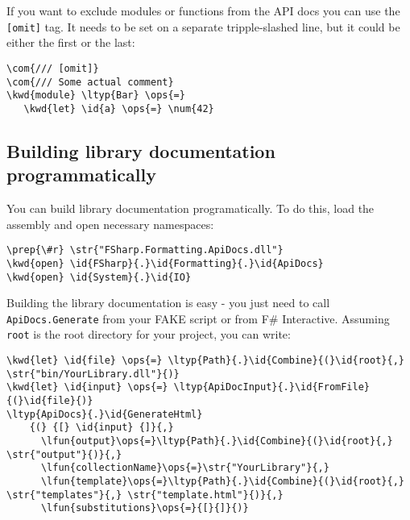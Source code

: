 \documentclass{article}
\newcommand{\id}[1]{\textcolor{black}{#1}}
\newcommand{\com}[1]{\textcolor{officegreen}{#1}}
\newcommand{\kwd}[1]{\textcolor{navy}{#1}}
\newcommand{\num}[1]{\textcolor{officegreen}{#1}}
\newcommand{\ops}[1]{\textcolor{purple}{#1}}
\newcommand{\prep}[1]{\textcolor{purple}{#1}}
\newcommand{\str}[1]{\textcolor{olive}{#1}}
\begin{document}
If you want to exclude modules or functions from the API docs you can use the \texttt{[omit]} tag.
It needs to be set on a separate tripple-slashed line, but it could be either the first or the last:
\begin{Verbatim}[commandchars=\\\{\}]
\com{/// [omit]}
\com{/// Some actual comment}
\kwd{module} \ltyp{Bar} \ops{=} 
   \kwd{let} \id{a} \ops{=} \num{42}
\end{Verbatim}

\subsection*{Building library documentation programmatically}



You can build library documentation programatically. To do this, load the assembly and open necessary namespaces:
\begin{Verbatim}[commandchars=\\\{\}]
\prep{\#r} \str{"FSharp.Formatting.ApiDocs.dll"}
\kwd{open} \id{FSharp}{.}\id{Formatting}{.}\id{ApiDocs}
\kwd{open} \id{System}{.}\id{IO}
\end{Verbatim}



Building the library documentation is easy - you just need to call
\texttt{ApiDocs.Generate} from your FAKE script or from F\# Interactive.
Assuming \texttt{root} is the root directory for your project, you can write:
\begin{Verbatim}[commandchars=\\\{\}]
\kwd{let} \id{file} \ops{=} \ltyp{Path}{.}\id{Combine}{(}\id{root}{,} \str{"bin/YourLibrary.dll"}{)}
\kwd{let} \id{input} \ops{=} \ltyp{ApiDocInput}{.}\id{FromFile}{(}\id{file}{)} 
\ltyp{ApiDocs}{.}\id{GenerateHtml}
    {(} {[} \id{input} {]}{,} 
      \lfun{output}\ops{=}\ltyp{Path}{.}\id{Combine}{(}\id{root}{,} \str{"output"}{)}{,}
      \lfun{collectionName}\ops{=}\str{"YourLibrary"}{,}
      \lfun{template}\ops{=}\ltyp{Path}{.}\id{Combine}{(}\id{root}{,} \str{"templates"}{,} \str{"template.html"}{)}{,}
      \lfun{substitutions}\ops{=}{[}{]}{)}
\end{Verbatim}
\end{document}
